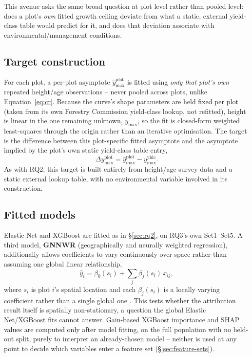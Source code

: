 This avenue asks the same broad question at plot level rather than pooled level: does a plot's
\emph{own} fitted growth ceiling deviate from what a static, external yield-class table would
predict for it, and does that deviation associate with environmental/management conditions.

\subsection{Target construction}

For each plot, a per-plot asymptote $\hat y_{\max}^{\text{plot}}$ is fitted using \emph{only that
plot's own} repeated height/age observations -- never pooled across plots, unlike
Equation~\ref{eq:cr}. Because the curve's shape parameters are held fixed per plot (taken from
its own Forestry Commission yield-class lookup, not refitted), height is linear in the one
remaining unknown, $y_{\max}$, so the fit is closed-form weighted least-squares through the
origin rather than an iterative optimisation. The target is the difference between this
plot-specific fitted asymptote and the asymptote implied by the plot's own static yield-class
table entry,
\begin{equation}
\Delta y_{\max}^{\text{plot}} = \hat y_{\max}^{\text{plot}} - y_{\max}^{\text{yldc}}.
\label{eq:local-ymax-diff}
\end{equation}
As with RQ2, this target is built entirely from height/age survey data and a static external
lookup table, with no environmental variable involved in its construction.

\subsection{Fitted models}

Elastic Net and XGBoost are fitted as in \S\ref{sec:rq2}, on RQ3's own Set1--Set5. A third model,
\textbf{GNNWR} (geographically and neurally weighted regression), additionally allows coefficients
to vary continuously over space rather than assuming one global linear relationship,
\begin{equation}
\hat y_i = \beta_0(s_i) + \sum_j \beta_j(s_i)\,x_{ij},
\label{eq:gnnwr}
\end{equation}
where $s_i$ is plot $i$'s spatial location and each $\beta_j(s_i)$ is a locally varying
coefficient rather than a single global one \citep{du2020}. %
This tests whether the attribution result itself is spatially non-stationary, a question the
global Elastic Net/XGBoost fits cannot answer. Gain-based XGBoost importance and SHAP values are
computed only after model fitting, on the full population with no held-out split, purely to
interpret an already-chosen model -- neither is used at any point to decide which variables enter
a feature set (\S\ref{sec:feature-sets}).

